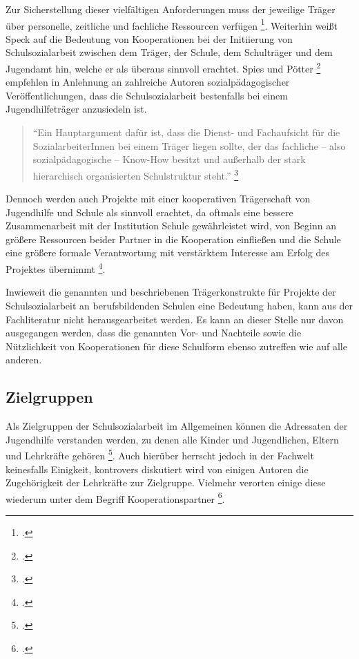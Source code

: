 \noindent
Zur Sicherstellung dieser vielfältigen Anforderungen muss der jeweilige Träger über personelle, zeitliche und fachliche Ressourcen verfügen \footcite[vgl.]{BIVSD2013}. Weiterhin weißt Speck auf die Bedeutung von Kooperationen bei der Initiierung von Schulsozialarbeit zwischen dem Träger, der Schule, dem Schulträger und dem Jugendamt hin, welche er als überaus sinnvoll erachtet. Spies und Pötter \footcite[64]{Spies2011} empfehlen in Anlehnung an zahlreiche Autoren sozialpädagogischer Veröffentlichungen, dass die Schulsozialarbeit bestenfalls bei einem Jugendhilfeträger anzusiedeln ist. 

\begin{quotation}
\noindent
"`Ein Hauptargument dafür ist, dass die Dienst- und Fachaufsicht für die SozialarbeiterInnen bei einem Träger liegen sollte, der das fachliche -- also sozialpädagogische -- Know-How besitzt und außerhalb der stark hierarchisch organisierten Schulstruktur steht."' \footcite[64]{Spies2011}
\end{quotation}

\noindent
Dennoch werden auch Projekte mit einer kooperativen Trägerschaft von Jugendhilfe und Schule als sinnvoll erachtet, da oftmals eine bessere Zusammenarbeit mit der Institution Schule gewährleistet wird, von Beginn an größere Ressourcen beider Partner in die Kooperation einfließen und die Schule eine größere formale Verantwortung mit verstärktem Interesse am Erfolg des Projektes übernimmt \footcite[vgl.][64]{Spies2011}.

Inwieweit die genannten und beschriebenen Trägerkonstrukte für Projekte der Schulsozialarbeit  an berufsbildenden Schulen eine Bedeutung haben, kann aus der Fachliteratur nicht herausgearbeitet werden. Es kann an dieser Stelle nur davon ausgegangen werden, dass die genannten Vor- und Nachteile sowie die Nützlichkeit von Kooperationen für diese Schulform ebenso zutreffen wie auf alle anderen. 

\subsection{Zielgruppen}
\label{sec:Zielgruppen}

Als Zielgruppen der Schulsozialarbeit im Allgemeinen können die Adressaten der Jugendhilfe verstanden werden, zu denen alle Kinder und Jugendlichen, Eltern und Lehrkräfte gehören \footcite[vgl.][31]{Speck2007}. Auch hierüber herrscht jedoch in der Fachwelt keinesfalls Einigkeit, kontrovers diskutiert wird von einigen Autoren die Zugehörigkeit der Lehrkräfte zur Zielgruppe. Vielmehr verorten einige diese wiederum unter dem Begriff Kooperationspartner \footcite[vgl.][50]{Spies2011}. 


